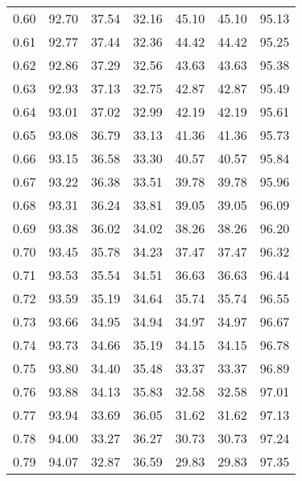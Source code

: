 \begin{tabular}{|c|c|c|c|c|c|c|}
      0.60 &     92.70 &     37.54 &      32.16 &   45.10 &      45.10 &         95.13 \\
      0.61 &     92.77 &     37.44 &      32.36 &   44.42 &      44.42 &         95.25 \\
      0.62 &     92.86 &     37.29 &      32.56 &   43.63 &      43.63 &         95.38 \\
      0.63 &     92.93 &     37.13 &      32.75 &   42.87 &      42.87 &         95.49 \\
      0.64 &     93.01 &     37.02 &      32.99 &   42.19 &      42.19 &         95.61 \\
      0.65 &     93.08 &     36.79 &      33.13 &   41.36 &      41.36 &         95.73 \\
      0.66 &     93.15 &     36.58 &      33.30 &   40.57 &      40.57 &         95.84 \\
      0.67 &     93.22 &     36.38 &      33.51 &   39.78 &      39.78 &         95.96 \\
      0.68 &     93.31 &     36.24 &      33.81 &   39.05 &      39.05 &         96.09 \\
      0.69 &     93.38 &     36.02 &      34.02 &   38.26 &      38.26 &         96.20 \\
      0.70 &     93.45 &     35.78 &      34.23 &   37.47 &      37.47 &         96.32 \\
      0.71 &     93.53 &     35.54 &      34.51 &   36.63 &      36.63 &         96.44 \\
      0.72 &     93.59 &     35.19 &      34.64 &   35.74 &      35.74 &         96.55 \\
      0.73 &     93.66 &     34.95 &      34.94 &   34.97 &      34.97 &         96.67 \\
      0.74 &     93.73 &     34.66 &      35.19 &   34.15 &      34.15 &         96.78 \\
      0.75 &     93.80 &     34.40 &      35.48 &   33.37 &      33.37 &         96.89 \\
      0.76 &     93.88 &     34.13 &      35.83 &   32.58 &      32.58 &         97.01 \\
      0.77 &     93.94 &     33.69 &      36.05 &   31.62 &      31.62 &         97.13 \\
      0.78 &     94.00 &     33.27 &      36.27 &   30.73 &      30.73 &         97.24 \\
      0.79 &     94.07 &     32.87 &      36.59 &   29.83 &      29.83 &         97.35 \\

\end{tabular}
